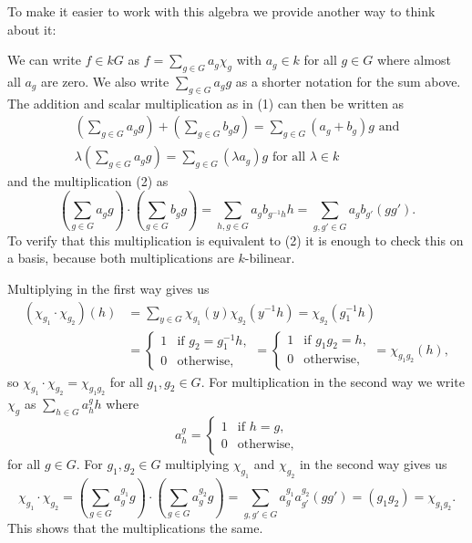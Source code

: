 To make it easier to work with this algebra we provide another way to think about it:

We can write $f \in kG$ as $f = \sum_{g \in G} a_g \chi_g$ with $a_g \in k$ for all $g \in G$ where almost all $a_g$ are zero. We also write $\sum_{g \in G} a_g g$ as a shorter notation for the sum above. The addition and scalar multiplication as in (1) can then be written as
\begin{gather*}
 \left( \sum_{g \in G} a_g g \right) + \left( \sum_{g \in G} b_g g \right) = \sum_{g \in G} (a_g+b_g) g \text{ and}\\
 \lambda \left( \sum_{g \in G} a_g g \right) = \sum_{g \in G} (\lambda a_g) g \text{ for all } \lambda \in k
\end{gather*}
and the multiplication (2) as
\[
 \left( \sum_{g \in G} a_g g \right) \cdot \left( \sum_{g \in G} b_g g \right)
 = \sum_{h, g \in G} a_g b_{g^{-1}h} h
 = \sum_{g, g' \in G} a_g b_{g'} (g g').
\]
To verify that this multiplication is equivalent to (2) it is enough to check this on a basis, because both multiplications are $k$-bilinear.

Multiplying in the first way gives us
\begin{align*}
 \left( \chi_{g_1} \cdot \chi_{g_2} \right)(h)
 &= \sum_{y \in G} \chi_{g_1}(y) \chi_{g_2}\left(y^{-1} h\right)
 = \chi_{g_2}\left(g_1^{-1}h\right) \\
 &= \begin{cases} 1 & \text{if } g_2 = g_1^{-1}h, \\ 0 & \text{otherwise}, \end{cases}
 = \begin{cases} 1 & \text{if } g_1 g_2 = h, \\ 0 & \text{otherwise}, \end{cases}
 = \chi_{g_1 g_2}(h),
\end{align*}
so $\chi_{g_1} \cdot \chi_{g_2} = \chi_{g_1 g_2}$ for all $g_1, g_2 \in G$.
For multiplication in the second way we write $\chi_g$ as $\sum_{h \in G} a^g_h h$ where
\[
 a^g_h = \begin{cases} 1 & \text{if } h = g, \\ 0 & \text{otherwise}, \end{cases}
\]
for all $g \in G$. For $g_1, g_2 \in G$ multiplying $\chi_{g_1}$ and $\chi_{g_2}$ in the second way gives us
\[
 \chi_{g_1} \cdot \chi_{g_2}
 = \left( \sum_{g \in G} a^{g_1}_g g \right) \cdot \left( \sum_{g \in G} a^{g_2}_g g \right)
 = \sum_{g,g' \in G} a^{g_1}_g a^{g_2}_{g'} (g g')
 = (g_1 g_2)
 = \chi_{g_1 g_2}.
\]
This shows that the multiplications the same.

